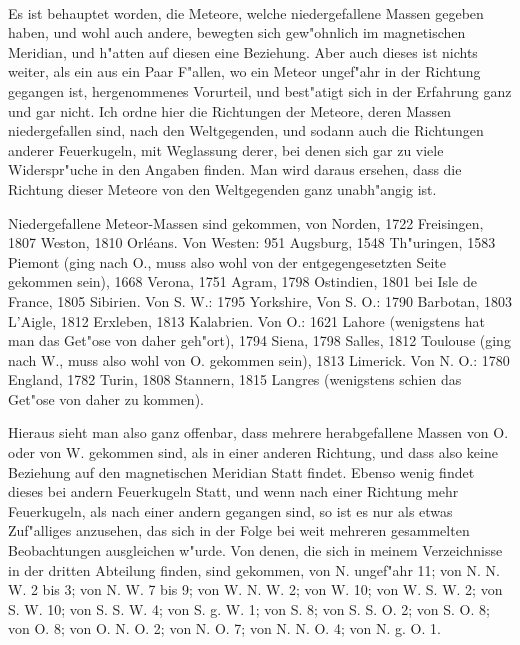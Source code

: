 \documentclass[a4paper, 11pt, oneside, polutonikogreek, german]{article}
\begin{document}
\paragraph{}
Es ist behauptet worden, die Meteore, welche niedergefallene Massen gegeben haben, und wohl auch andere, bewegten sich gew"ohnlich im magnetischen Meridian, und h"atten auf diesen eine Beziehung. Aber auch dieses ist nichts weiter, als ein aus ein Paar F"allen, wo ein Meteor ungef"ahr in der Richtung gegangen ist, hergenommenes Vorurteil, und best"atigt sich in der Erfahrung ganz und gar nicht. Ich ordne hier die Richtungen der Meteore, deren Massen niedergefallen sind, nach den Weltgegenden, und sodann auch die Richtungen anderer Feuerkugeln, mit Weglassung derer, bei denen sich gar zu viele Widerspr"uche in den Angaben finden. Man wird daraus ersehen, dass die Richtung dieser Meteore von den Weltgegenden ganz unabh"angig ist.

Niedergefallene Meteor-Massen sind gekommen, von Norden, 1722 Freisingen, 1807 Weston, 1810 Orléans. Von Westen: 951 Augsburg, 1548 Th"uringen, 1583 Piemont (ging nach O., muss also wohl von der entgegengesetzten Seite gekommen sein), 1668 Verona, 1751 Agram, 1798 Ostindien, 1801 bei Isle de France, 1805 Sibirien. Von S. W.: 1795 Yorkshire, Von S. O.: 1790 Barbotan, 1803 L'Aigle, 1812 Erxleben, 1813 Kalabrien. Von O.: 1621 Lahore (wenigstens hat man das Get"ose von daher geh"ort), 1794 Siena, 1798 Salles, 1812 Toulouse (ging nach W., muss also wohl von O. gekommen sein), 1813 Limerick. Von N. O.: 1780 England, 1782 Turin, 1808 Stannern, 1815 Langres (wenigstens schien das Get"ose von daher zu kommen).

Hieraus sieht man also ganz offenbar, dass mehrere herabgefallene Massen von O. oder von W. gekommen sind, als in einer anderen Richtung, und dass also keine Beziehung auf den magnetischen Meridian Statt findet. Ebenso wenig findet dieses bei andern Feuerkugeln Statt, und wenn nach einer Richtung mehr Feuerkugeln, als nach einer andern gegangen sind, so ist es nur als etwas Zuf"alliges anzusehen, das sich in der Folge bei weit mehreren gesammelten Beobachtungen ausgleichen w"urde. Von denen, die sich in meinem Verzeichnisse in der dritten Abteilung finden, sind gekommen, von N. ungef"ahr 11; von N. N. W. 2 bis 3; von N. W. 7 bis 9; von W. N. W. 2; von W. 10; von W. S. W. 2; von S. W. 10; von S. S. W. 4; von S. g. W. 1; von S. 8; von S. S. O. 2; von S. O. 8; von O. 8; von O. N. O. 2; von N. O. 7; von N. N. O. 4; von N. g. O. 1.
\subsection{}
\end{document}
